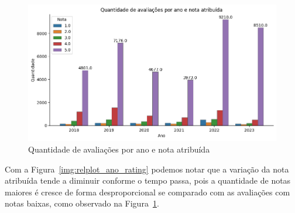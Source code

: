 \begin{figure}
	\centering
	\includegraphics[width=1\textwidth]{figs/exploratoria/quantidade_avaliacao_nota_atribuida_ano.png}
	\caption{Quantidade de avaliações por ano e nota atribuída}
	\label{img:dist_review_rating_per_year}
\end{figure}

Com a Figura~\ref{img:relplot_ano_rating} podemos notar que a variação da nota atribuída tende a diminuir conforme o tempo passa, pois a quantidade de notas maiores é cresce de forma desproporcional se comparado com as avaliações com notas baixas, como observado na Figura~\ref{img:dist_review_rating_per_year}.


